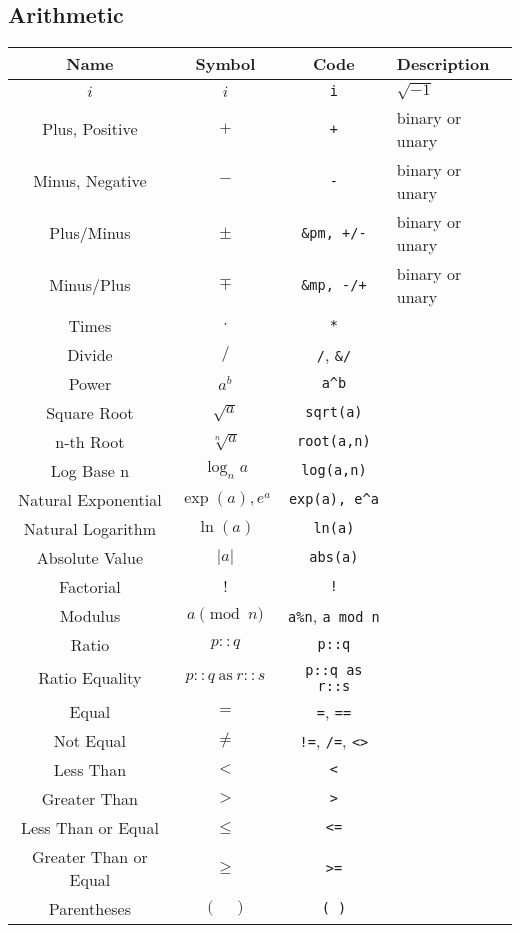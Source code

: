 \documentclass{article}
\begin{document}
  \subsection{Arithmetic} %
  \label{sub:arithmetic}
  \begin{table}[!h]
    \centering
    \begin{tabular}{|c|c|c|l|}
      \hline
      \textbf{Name} & \textbf{Symbol} & \textbf{Code} & \textbf{Description} \\
      \hline\hline
      \( i \) & \( i \) & \texttt{i} & \( \sqrt{-1} \)\\
      Plus, Positive & \( + \) & \texttt{+} & binary or unary\\
      Minus, Negative & \( - \) & \texttt{-} & binary or unary\\
      Plus/Minus & \( \pm \) & \texttt{\&pm, +/-} & binary or unary\\
      Minus/Plus & \( \mp \) & \texttt{\&mp, -/+} & binary or unary\\
      Times & \( \cdot \) & \texttt{*} & \\
      Divide & \( / \) & \texttt{/}, \texttt{\&/} & \\
      Power & \( a^b \) & \texttt{a\^{}b} & \\
      Square Root & \( \sqrt{a} \) & \texttt{sqrt(a)} & \\
      n-th Root & \( \sqrt[n]{a} \) & \texttt{root(a,n)} & \\
      Log Base n & \( \log_n{a} \) & \texttt{log(a,n)} & \\
      Natural Exponential & \( \exp(a), e^a \) & \texttt{exp(a), e\^{}a} & \\
      Natural Logarithm & \( \ln(a) \) & \texttt{ln(a)} & \\
      Absolute Value & \( \left| a \right| \) & \texttt{abs(a)} & \\
      Factorial & \( ! \) & \texttt{!} & \\
      Modulus & \( a \pmod{n} \) & \texttt{a\%n}, \texttt{a mod n} & \\
      \hline
      Ratio & \( p::q \) & \texttt{p::q} & \\
      Ratio Equality & \( p::q ~\mathrm{as}~ r::s \) & \texttt{p::q as r::s} & \\
      \hline
      Equal & \( = \) & \texttt{=}, \texttt{==} & \\
      Not Equal & \( \ne \) & \texttt{!=}, \texttt{/=}, \texttt{<>} & \\
      Less Than & \( < \) & \texttt{<} & \\
      Greater Than & \( > \) & \texttt{>} & \\
      Less Than or Equal & \( \le \) & \texttt{<=} & \\
      Greater Than or Equal & \( \ge \) & \texttt{>=} & \\
      Parentheses & \( ( \quad ) \) & \texttt{( )} & \\
      \hline
    \end{tabular}
  \end{table}
\end{document}
